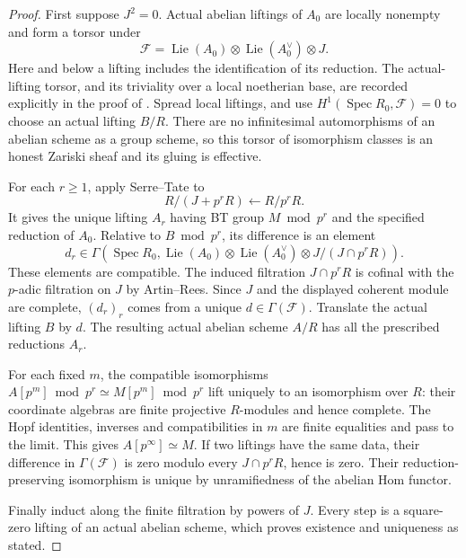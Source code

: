 \begin{proof}
First suppose $J^2=0$. Actual abelian liftings of $A_0$ are locally
nonempty and form a torsor under
\[
 \mathcal F=\operatorname{Lie}(A_0)\otimes
             \operatorname{Lie}(A_0^\vee)\otimes J.
\]
Here and below a lifting includes the identification of its reduction.
The actual-lifting torsor, and its triviality over a local noetherian
base, are recorded explicitly in the proof of
\cite[Lemma~24, p.590]{VasiuZink2010Purity}. Spread local liftings,
and use $H^1(\operatorname{Spec}R_0,\mathcal F)=0$ to choose an actual
lifting $B/R$. There are no infinitesimal automorphisms of an abelian
scheme as a group scheme, so this torsor of isomorphism classes is
an honest Zariski sheaf and its gluing is effective.

For each $r\geq1$, apply Serre--Tate to
\[
 R/(J+p^rR)\longleftarrow R/p^rR.
\]
It gives the unique lifting $A_r$ having BT group $M\bmod p^r$ and
the specified reduction of $A_0$. Relative to $B\bmod p^r$, its
difference is an element
\[
 d_r\in\Gamma\!\left(\operatorname{Spec}R_0,
   \operatorname{Lie}(A_0)\otimes\operatorname{Lie}(A_0^\vee)
        \otimes J/(J\cap p^rR)\right).
\]
These elements are compatible. The induced filtration
$J\cap p^rR$ is cofinal with the $p$-adic filtration on $J$ by
Artin--Rees. Since $J$ and the displayed coherent module are complete,
$(d_r)_r$ comes from a unique $d\in\Gamma(\mathcal F)$.
Translate the actual lifting $B$ by $d$. The resulting actual abelian
scheme $A/R$ has all the prescribed reductions $A_r$.

For each fixed $m$, the compatible isomorphisms
$A[p^m]\bmod p^r\simeq M[p^m]\bmod p^r$ lift uniquely to an
isomorphism over $R$: their coordinate algebras are finite projective
$R$-modules and hence complete. The Hopf identities, inverses and
compatibilities in $m$ are finite equalities and pass to the limit.
This gives $A[p^\infty]\simeq M$. If two liftings have the same data,
their difference in $\Gamma(\mathcal F)$ is zero modulo every
$J\cap p^rR$, hence is zero. Their reduction-preserving isomorphism
is unique by unramifiedness of the abelian Hom functor.

Finally induct along the finite filtration by powers of $J$.
Every step is a square-zero lifting of an actual abelian scheme,
which proves existence and uniqueness as stated.
\end{proof}

